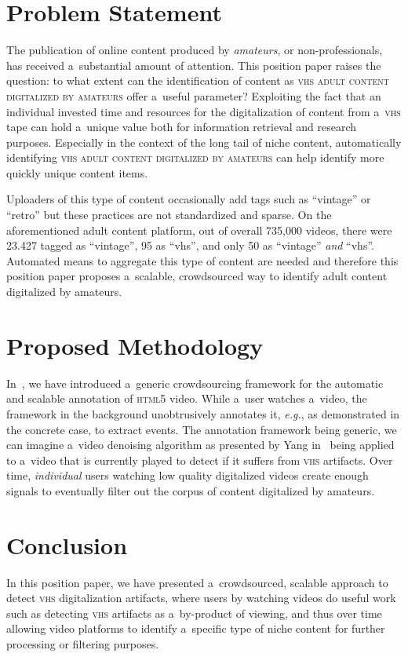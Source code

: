 \documentclass{sig-alternate}
\begin{document}
\section{Problem Statement}

The publication of online content produced by
\emph{amateurs}, or non-professionals, has
received a~substantial amount of attention.
This position paper raises the question: to what extent
can the identification of content as {\scshape vhs adult content digitalized by amateurs}
offer a~useful parameter?
Exploiting the fact that an individual invested time and resources for the
digitalization of content from a~{\scshape vhs} tape can hold a~unique value
both for information retrieval and research purposes.
Especially in the context of the long tail of niche content,
automatically identifying {\scshape vhs adult content digitalized by amateurs}
can help identify more quickly unique content items.

Uploaders of this type of content occasionally add tags
such as ``vintage'' or ``retro'' but these practices are not standardized and sparse.
On the aforementioned adult content platform, out of overall 735,000 videos,
there were 23.427 tagged as ``vintage'', 95 as ``vhs'',
and only 50 as ``vintage'' \emph{and} ``vhs''.
Automated means to aggregate this type of content are needed
and therefore this position paper proposes a~scalable, crowdsourced way
to identify adult content digitalized by amateurs.

\section{Proposed Methodology}

In~\cite{steiner2011crowdsourcing}, we have introduced
a~generic crowdsourcing framework for the automatic and scalable
annotation of {\scshape html5} video.
While a~user watches a~video, the framework in the background
unobtrusively annotates it, \emph{e.g.}, as demonstrated
in the concrete case, to extract events.
The annotation framework being generic,
we can imagine a~video denoising algorithm
as presented by Yang in~\cite{yang2009videonoise}
being applied to a~video that is currently played
to detect if it suffers from {\scshape vhs} artifacts.
Over time, \emph{individual} users watching low quality digitalized videos
create enough signals to eventually filter out the corpus of
content digitalized by amateurs.

\section{Conclusion}

In this position paper, we have presented a~crowdsourced,
scalable approach to detect {\scshape vhs} digitalization artifacts,
where users by watching videos do useful work such as
detecting {\scshape vhs} artifacts as a~by-product of viewing,
and thus over time allowing video platforms to identify
a~specific type of niche content for further processing or filtering purposes.



\end{document}

